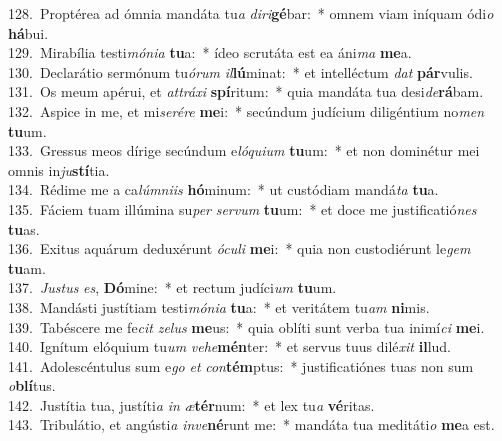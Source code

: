 {128.~}Proptérea ad ómnia mandáta tu\textit{a} \textit{di}\textit{ri}\textbf{gé}bar:~* omnem viam iníquam ódi\textit{o} \textbf{há}bui.\\
{129.~}Mirabília testi\textit{mó}\textit{ni}\textit{a} \textbf{tu}a:~* ídeo scrutáta est ea áni\textit{ma} \textbf{me}a.\\
{130.~}Declarátio sermónum tu\textit{ó}\textit{rum} \textit{il}\textbf{lú}minat:~* et intelléctum \textit{dat} \textbf{pár}vulis.\\
{131.~}Os meum apérui, et \textit{at}\textit{trá}\textit{xi} \textbf{spí}ritum:~* quia mandáta tua desi\textit{de}\textbf{rá}bam.\\
{132.~}Aspice in me, et mi\textit{se}\textit{ré}\textit{re} \textbf{me}i:~* secúndum judícium diligéntium no\textit{men} \textbf{tu}um.\\
{133.~}Gressus meos dírige secúndum e\textit{ló}\textit{qui}\textit{um} \textbf{tu}um:~* et non dominétur mei omnis in\textit{ju}\textbf{stí}tia.\\
{134.~}Rédime me a ca\textit{lúm}\textit{ni}\textit{is} \textbf{hó}minum:~* ut custódiam mandá\textit{ta} \textbf{tu}a.\\
{135.~}Fáciem tuam illúmina su\textit{per} \textit{ser}\textit{vum} \textbf{tu}um:~* et doce me justificatió\textit{nes} \textbf{tu}as.\\
{136.~}Exitus aquárum deduxérunt \textit{ó}\textit{cu}\textit{li} \textbf{me}i:~* quia non custodiérunt le\textit{gem} \textbf{tu}am.\\
{137.~}\textit{Ju}\textit{stus} \textit{es}, \textbf{Dó}mine:~* et rectum judíci\textit{um} \textbf{tu}um.\\
{138.~}Mandásti justítiam testi\textit{mó}\textit{ni}\textit{a} \textbf{tu}a:~* et veritátem tu\textit{am} \textbf{ni}mis.\\
{139.~}Tabéscere me fe\textit{cit} \textit{ze}\textit{lus} \textbf{me}us:~* quia oblíti sunt verba tua inimí\textit{ci} \textbf{me}i.\\
{140.~}Ignítum elóquium tu\textit{um} \textit{ve}\textit{he}\textbf{mén}ter:~* et servus tuus dilé\textit{xit} \textbf{il}lud.\\
{141.~}Adolescéntulus sum e\textit{go} \textit{et} \textit{con}\textbf{tém}ptus:~* justificatiónes tuas non sum \textit{o}\textbf{blí}tus.\\
{142.~}Justítia tua, justíti\textit{a} \textit{in} \textit{æ}\textbf{tér}num:~* et lex tu\textit{a} \textbf{vé}ritas.\\
{143.~}Tribulátio, et angústi\textit{a} \textit{in}\textit{ve}\textbf{né}runt me:~* mandáta tua meditáti\textit{o} \textbf{me}a est.\\
